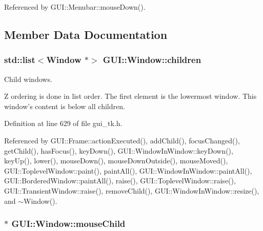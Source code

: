 Referenced by G\-U\-I\-::\-Menubar\-::mouse\-Down().



\subsection{Member Data Documentation}
\hypertarget{classGUI_1_1Window_ac10e617306be4367ed164ea97f5d3132}{
\subsubsection[{children}]{\setlength{\rightskip}{0pt plus 5cm}std\-::list$<${\bf Window} $\ast$$>$ {\bf G\-U\-I\-::\-Window\-::children}}}\label{classGUI_1_1Window_ac10e617306be4367ed164ea97f5d3132}


Child windows. 

Z ordering is done in list order. The first element is the lowermost window. This window's content is below all children. 

Definition at line 629 of file gui\-\_\-tk.\-h.



Referenced by G\-U\-I\-::\-Frame\-::action\-Executed(), add\-Child(), focus\-Changed(), get\-Child(), has\-Focus(), key\-Down(), G\-U\-I\-::\-Window\-In\-Window\-::key\-Down(), key\-Up(), lower(), mouse\-Down(), mouse\-Down\-Outside(), mouse\-Moved(), G\-U\-I\-::\-Toplevel\-Window\-::paint(), paint\-All(), G\-U\-I\-::\-Window\-In\-Window\-::paint\-All(), G\-U\-I\-::\-Bordered\-Window\-::paint\-All(), raise(), G\-U\-I\-::\-Toplevel\-Window\-::raise(), G\-U\-I\-::\-Transient\-Window\-::raise(), remove\-Child(), G\-U\-I\-::\-Window\-In\-Window\-::resize(), and $\sim$\-Window().

\hypertarget{classGUI_1_1Window_addd401dab430594e678366e7ff73ef2d}{
\subsubsection[{mouse\-Child}]{$\ast$ {\bf G\-U\-I\-::\-Window\-::mouse\-Child}}}\label{classGUI_1_1Window_addd401dab430594e678366e7ff73ef2d}


